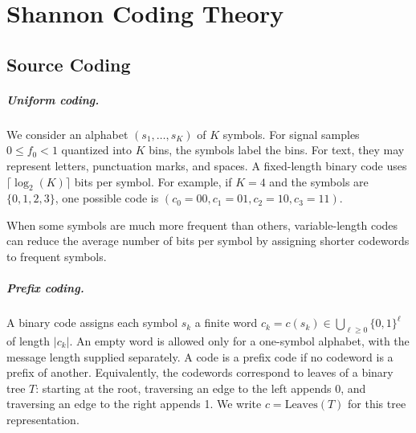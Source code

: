 

\chapter{Shannon Coding Theory}
\label{sec-shannon}


\section{Source Coding}
\label{sec-shannon-source}

\newcommand{\Symb}{s}

\paragraph{Uniform coding.}

We consider an alphabet $(\Symb_1,\ldots,\Symb_K)$ of $K$ symbols. For signal samples $0 \leq f_0 < 1$ quantized into $K$ bins, the symbols label the bins. For text, they may represent letters, punctuation marks, and spaces.
%
A fixed-length binary code uses $\lceil \log_2(K) \rceil$ bits per symbol.
For example, if $K=4$ and the symbols are $\{0,1,2,3\}$, one possible code is $(c_0=00,c_1=01,c_2=10,c_3=11)$.

When some symbols are much more frequent than others, variable-length codes can reduce the average number of bits per symbol by assigning shorter codewords to frequent symbols.

\paragraph{Prefix coding.}
 

A binary code assigns each symbol $\Symb_k$ a finite word $c_k=c(\Symb_k)\in\bigcup_{\ell\geq0}\{0,1\}^{\ell}$ of length $|c_k|$. An empty word is allowed only for a one-symbol alphabet, with the message length supplied separately.
%
A code is a prefix code if no codeword is a prefix of another. Equivalently, the codewords correspond to leaves of a binary tree $T$: starting at the root, traversing an edge to the left appends 0, and traversing an edge to the right appends 1.
%
We write $c=\text{Leaves}(T)$ for this tree representation.


